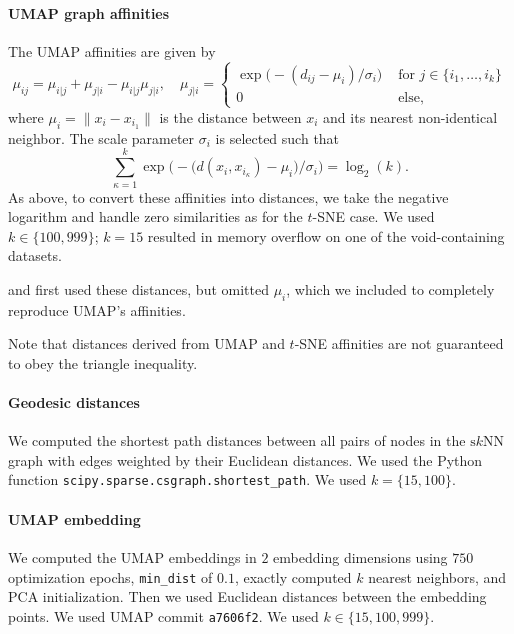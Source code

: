 \documentclass{article}
\newcommand{\sknn}{\ensuremath{\text{s}k\text{NN}}}
\theoremstyle{plain}
\theoremstyle{definition}
\theoremstyle{remark}
\begin{document}
\paragraph{UMAP graph affinities}
The UMAP affinities are given by 
\begin{equation}
    \mu_{ij} = \mu_{i|j} + \mu_{j| i} - \mu_{i| j}\mu_{j| i}, \quad
    \mu_{j|i} = 
    \begin{cases}
        \exp\big(-(d_{ij} - \mu_i)/\sigma_i\big) &\text{ for } j \in \{i_1, \dots, i_k\}\\
        0 &\text{ else,}
    \end{cases}
\end{equation}
where $\mu_i = \|x_i- x_{i_1}\|$ is the distance between $x_i$ and its nearest non-identical neighbor. The scale parameter $\sigma_i$ is selected such that 
\begin{equation}
    \sum_{\kappa=1}^k \exp\Big(-\big(d(x_i, x_{i_\kappa}) - \mu_i\big) / \sigma_i\Big) = \log_2(k).
\end{equation}
As above, to convert these affinities into distances, we take the negative logarithm and handle zero similarities as for the $t$-SNE case. We used $k\in\{100, 999\}$; $k=15$ resulted in memory overflow on one of the void-containing datasets.

\citet{gardner2022toroidal} and \citet{hermansen2024uncovering} first used these distances, but omitted $\mu_i$, which we included to completely reproduce UMAP's affinities. 

Note that distances derived from UMAP and $t$-SNE affinities are not guaranteed to obey the triangle inequality.

\paragraph{Geodesic distances}
We computed the shortest path distances between all pairs of nodes in the \sknn{} graph with edges weighted by their Euclidean distances. We used the Python function \texttt{scipy.sparse.csgraph.shortest\_path}. We used $k=\{15, 100\}$.

\paragraph{UMAP embedding}
We computed the UMAP embeddings in $2$ embedding dimensions using $750$ optimization epochs, \texttt{min\_dist} of $0.1$, exactly computed $k$ nearest neighbors, and PCA initialization. Then we used Euclidean distances between the embedding points. We used UMAP commit \texttt{a7606f2}. We used $k\in\{15, 100, 999\}$.
\end{document}
